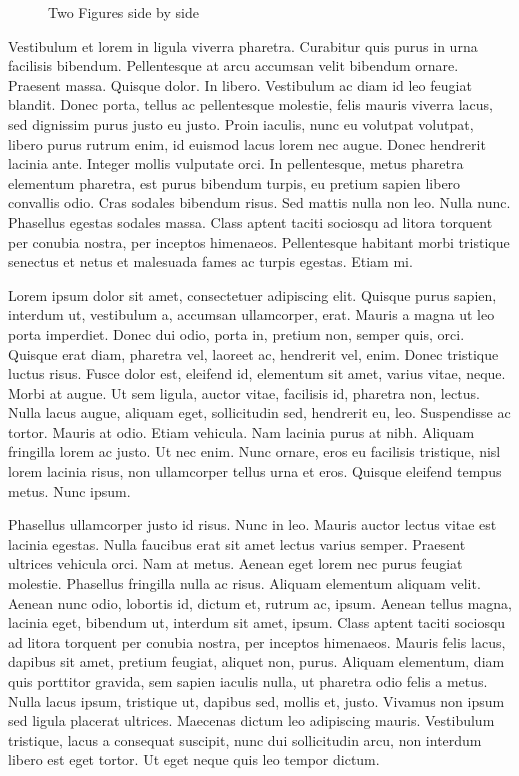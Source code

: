 \begin{figure}
  \qquad
  \caption{Two Figures side by side}
  \label{fig:2figs}
\end{figure}

Vestibulum et lorem in ligula viverra pharetra. Curabitur quis purus
in urna facilisis bibendum. Pellentesque at arcu accumsan velit
bibendum ornare. Praesent massa. Quisque dolor. In libero. Vestibulum
ac diam id leo feugiat blandit. Donec porta, tellus ac pellentesque
molestie, felis mauris viverra lacus, sed dignissim purus justo eu
justo. Proin iaculis, nunc eu volutpat volutpat, libero purus rutrum
enim, id euismod lacus lorem nec augue. Donec hendrerit lacinia
ante. Integer mollis vulputate orci. In pellentesque, metus pharetra
elementum pharetra, est purus bibendum turpis, eu pretium sapien
libero convallis odio. Cras sodales bibendum risus. Sed mattis nulla
non leo. Nulla nunc. Phasellus egestas sodales massa. Class aptent
taciti sociosqu ad litora torquent per conubia nostra, per inceptos
himenaeos. Pellentesque habitant morbi tristique senectus et netus et
malesuada fames ac turpis egestas. Etiam mi. 

Lorem ipsum dolor sit amet, consectetuer adipiscing elit. Quisque
purus sapien, interdum ut, vestibulum a, accumsan ullamcorper,
erat. Mauris a magna ut leo porta imperdiet. Donec dui odio, porta in,
pretium non, semper quis, orci. Quisque erat diam, pharetra vel,
laoreet ac, hendrerit vel, enim. Donec tristique luctus risus. Fusce
dolor est, eleifend id, elementum sit amet, varius vitae, neque. Morbi
at augue. Ut sem ligula, auctor vitae, facilisis id, pharetra non,
lectus. Nulla lacus augue, aliquam eget, sollicitudin sed, hendrerit
eu, leo. Suspendisse ac tortor. Mauris at odio. Etiam vehicula. Nam
lacinia purus at nibh. Aliquam fringilla lorem ac justo. Ut nec
enim. Nunc ornare, eros eu facilisis tristique, nisl lorem lacinia
risus, non ullamcorper tellus urna et eros. Quisque eleifend tempus
metus. Nunc ipsum. 

Phasellus ullamcorper justo id risus. Nunc in leo. Mauris auctor
lectus vitae est lacinia egestas. Nulla faucibus erat sit amet lectus
varius semper. Praesent ultrices vehicula orci. Nam at metus. Aenean
eget lorem nec purus feugiat molestie. Phasellus fringilla nulla ac
risus. Aliquam elementum aliquam velit. Aenean nunc odio, lobortis id,
dictum et, rutrum ac, ipsum. Aenean tellus magna, lacinia eget,
bibendum ut, interdum sit amet, ipsum. Class aptent taciti sociosqu ad
litora torquent per conubia nostra, per inceptos himenaeos. Mauris
felis lacus, dapibus sit amet, pretium feugiat, aliquet non,
purus. Aliquam elementum, diam quis porttitor gravida, sem sapien
iaculis nulla, ut pharetra odio felis a metus. Nulla lacus ipsum,
tristique ut, dapibus sed, mollis et, justo. Vivamus non ipsum sed
ligula placerat ultrices. Maecenas dictum leo adipiscing
mauris. Vestibulum tristique, lacus a consequat suscipit, nunc dui
sollicitudin arcu, non interdum libero est eget tortor. Ut eget neque
quis leo tempor dictum. 

